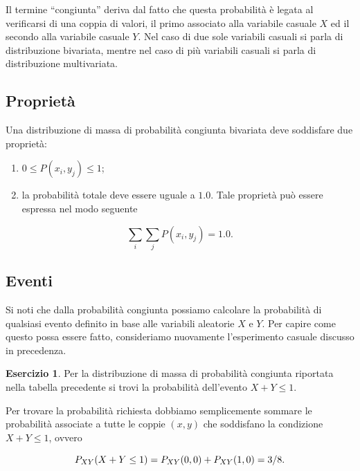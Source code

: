 \documentclass[
  11pt,
]{krantz}
\theoremstyle{definition}
\theoremstyle{definition}
\theoremstyle{definition}
\newtheorem{exercise}{Esercizio}[chapter]
\theoremstyle{definition}
\theoremstyle{remark}
\begin{document}
\noindent Il termine ``congiunta'' deriva dal fatto che questa probabilità è legata al verificarsi di una coppia di valori, il primo associato alla variabile casuale \(X\) ed il secondo alla variabile casuale \(Y\). Nel caso di due sole variabili casuali si parla di distribuzione bivariata, mentre nel caso di più variabili casuali si parla di distribuzione multivariata.

\hypertarget{proprietuxe0}{%
\subsection{Proprietà}\label{proprietuxe0}}

Una distribuzione di massa di probabilità congiunta bivariata deve soddisfare due proprietà:

\begin{enumerate}
\def\labelenumi{\arabic{enumi}.}
\item
  \(0 \leq P(x_i, y_j) \leq 1\);
\item
  la probabilità totale deve essere uguale a \(1.0\). Tale proprietà può essere espressa nel modo seguente
\end{enumerate}

\[
\sum_{i} \sum_{j} P(x_i, y_j) = 1.0.
\]

\hypertarget{eventi}{%
\subsection{Eventi}\label{eventi}}

Si noti che dalla probabilità congiunta possiamo calcolare la probabilità di qualsiasi evento definito in base alle variabili aleatorie \(X\) e \(Y\). Per capire come questo possa essere fatto, consideriamo nuovamente l'esperimento casuale discusso in precedenza.

\begin{exercise}
Per la distribuzione di massa di probabilità congiunta riportata nella tabella precedente si trovi la probabilità dell'evento \(X+Y \leq 1\).

Per trovare la probabilità richiesta dobbiamo semplicemente sommare le probabilità associate a tutte le coppie \((x,y)\) che soddisfano la condizione \(X+Y \leq 1\), ovvero

\begin{equation}
P_{XY}(X+Y \leq 1) = P_{XY}(0, 0) + P_{XY}(1, 0)= 3/8.\notag
\end{equation}
\end{exercise}
\end{document}

